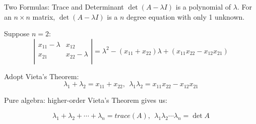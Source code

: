 \documentclass{beamer}
\begin{document}
\begin{frame}{Two Formulas: Trace and Determinant}
$\det(A-\lambda I)$ is a polynomial of $\lambda$. For an $n\times n$ matrix, $\det(A-\lambda I)$ is a $n$ degree equation with only 1 unknown.

\vspace{3pt}
Suppose $n=2$:
\begin{equation*}
    \left| \begin{matrix}
        x_{11}-\lambda&		x_{12}\\
        x_{21}&		x_{22}-\lambda\\
    \end{matrix} \right|=\lambda ^2-\left( x_{11}+x_{22} \right) \lambda +\left( x_{11}x_{22}-x_{12}x_{21} \right)
\end{equation*}

Adopt Vieta's Theorem:
\begin{equation*}
    \lambda _1+\lambda _2=x_{11}+x_{22},\:\: \lambda _1\lambda _2=x_{11}x_{22}-x_{12}x_{21}
\end{equation*}

\vspace{3pt}
Pure algebra: higher-order Vieta's Theorem gives us:

\begin{equation*}
    \lambda _1+\lambda _2+\cdots +\lambda _n=trace\left( A \right) ,\:\: \lambda _1\lambda _2\cdots \lambda _n=\det A
\end{equation*}
\end{frame}
\end{document}
